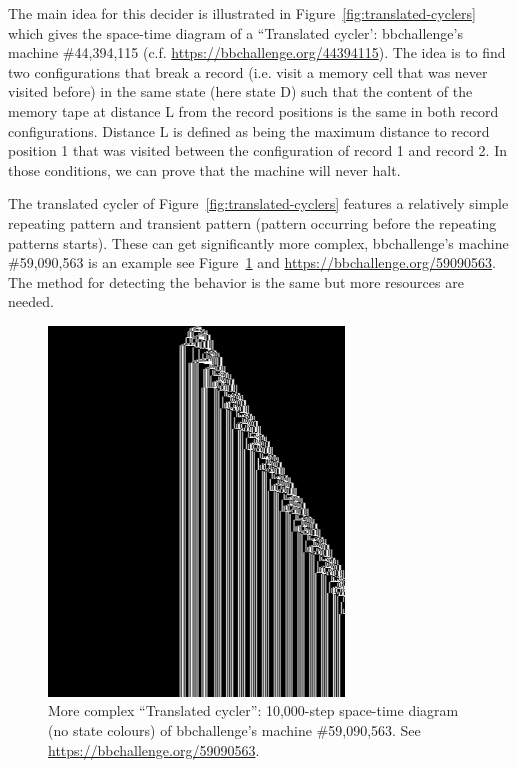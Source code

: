 The main idea for this decider is illustrated in Figure~\ref{fig:translated-cyclers} which gives the space-time diagram of a ``Translated cycler': bbchallenge's machine \#44,394,115 (c.f. \url{https://bbchallenge.org/44394115}). The idea is to find two configurations that break a record (i.e. visit a memory cell that was never visited before) in the same state (here state \textcolor{colorD}{D}) such that the content of the memory tape at distance L from the record positions is the same in both record configurations. Distance L is defined as being the maximum distance to record position 1 that was visited between the configuration of record 1 and record 2. In those conditions, we can prove that the machine will never halt.

The translated cycler of Figure~\ref{fig:translated-cyclers} features a relatively simple repeating pattern and transient pattern (pattern occurring before the repeating patterns starts). These can get significantly more complex, bbchallenge's machine \#59,090,563 is an example see Figure~\ref{fig:translated-cyclers-more} and \url{https://bbchallenge.org/59090563}. The method for detecting the behavior is the same but more resources are needed.


\begin{figure}
\centering
\includegraphics[width=0.7\textwidth]{space-time-diagrams/translated_cycler_59090563.png}

\caption{More complex ``Translated cycler'': 10,000-step space-time diagram (no state colours) of bbchallenge's machine \#59,090,563. See \url{https://bbchallenge.org/59090563}.}\label{fig:translated-cyclers-more}
\end{figure}


